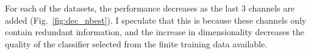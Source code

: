 For each of the datasets, the performance decreases as the last 3 channels are added (Fig.~\ref{fig:dec_nbest}). I speculate that this is because these channels only contain redundant information, and the increase in dimensionality decreases the quality of the classifier selected from the finite training data available.






